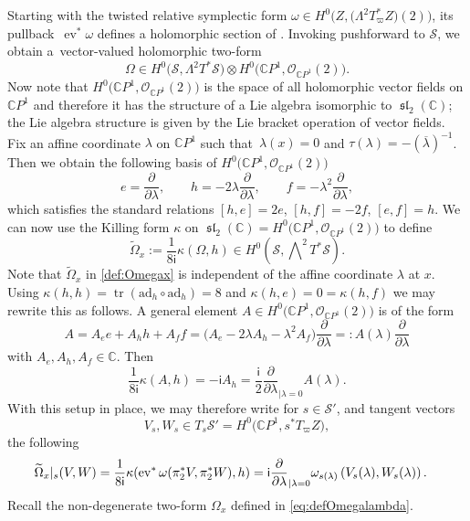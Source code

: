 \documentclass[pdftex]{sigma}
\numberwithin{equation}{section}
\theoremstyle{definition}
\newcommand{\lie}[1]{\operatorname{\mathfrak{#1}}}
\newcommand{\sln}{\lie{sl}}
\newcommand\C{{\mathbb C}}
\renewcommand{\i}{\mathsf{i}}
\newcommand{\pder}[2]{
		\IfEqCase{#1}{
			{}{\frac{\partial}{\partial {#2}}}
			{t}{\frac{\partial}{\partial {#2}}}
			}}
\begin{document}
Starting with the twisted relative symplectic form $\omega \in H^0\bigl(Z, \bigl(\Lambda^2T^*_\varpi Z\bigr)(2)\bigr)$, its pullback~$\operatorname{ev}^*\omega$ defines a holomorphic section of .
Invoking pushforward to $\mathcal S$, we obtain a~vector-valued holomorphic two-form
\begin{equation}\label{eq:Omegavector}
\Omega \in H^0\bigl(\mathcal S, \Lambda^2 T^*\mathcal S\bigr)\otimes H^0\bigl(\C P^1, \mathcal{O}_{\C P^1}(2)\bigr).
\end{equation}
Now note that $H^0\bigl(\C P^1, \mathcal{O}_{\C P^1}(2)\bigr)$ is the space of all holomorphic vector fields on $\C P^1$ and therefore
it has the structure of a Lie algebra isomorphic to $\sln_2(\C)$; the Lie algebra structure is given by the Lie bracket
operation of vector fields.
Fix an affine coordinate $\lambda$ on $\C P^1$ such that~${\lambda(x) = 0}$ and $\tau(\lambda)
 = -(\overline{\lambda})^{-1}$. Then we obtain the following basis of $H^0\bigl(\C P^1, \mathcal{O}_{\C P^1}(2)\bigr)$
\[%
e = \frac{\partial}{\partial\lambda},\qquad h = -2\lambda\frac{\partial}{\partial\lambda}, \qquad f
 = -\lambda^2\frac{\partial}{\partial\lambda},
\]
which satisfies the standard relations
$%
[h, e] = 2e$, $ [h, f] = -2f$, $ [e, f] = h$.
We can now use the Killing form $\kappa$ on $\sln_2(\C) = H^0\bigl(\C P^1, \mathcal{O}_{\C P^1}(2)\bigr)$ to define
\begin{equation}\label{def:Omegax}
\widetilde{\Omega}_x := \frac{1}{8 \i}\kappa(\Omega, h) \in
H^0\left(\mathcal S, \bigwedge\nolimits^2 T^*\mathcal S\right).
\end{equation}
Note that $\widetilde{\Omega}_x$ in \eqref{def:Omegax} is independent of the affine coordinate $\lambda$ at $x$.
Using $\kappa(h, h) = \operatorname{tr}(\mathrm{ad}_h\circ\mathrm{ad}_h) = 8$ and $\kappa(h, e)
 = 0 = \kappa(h, f)$ we may rewrite this as follows. A general element $A
 \in H^0\bigl(\C P^1, \mathcal{O}_{\C P^1}(2)\bigr)$ is of the form
\[A = A_ee + A_hh + A_ff = \bigl(A_e -2\lambda A_h-\lambda^2A_f\bigr)\frac{\partial}{\partial\lambda}
=: A(\lambda)\frac{\partial}{\partial\lambda}\]
with $A_e, A_h, A_f \in \C$. Then
\[
\frac{1}{8 \i}\kappa(A, h) = -\i A_h = \frac{\i}{2}\frac{\partial}{\partial\lambda}_{|\lambda =0}A(\lambda).
\]
With this setup in place, we may therefore write for $s \in \mathcal S'$, and tangent vectors
\[V_s, W_s \in T_s\mathcal S' = H^0\bigl(\C P^1, s^*T_{\varpi}Z\bigr),\]
the following
\begin{align}\label{eq:OmegaGeneral}
\widetilde\Omega_x\vert_s(V, W) & = \frac{1}{8\i}\kappa(\operatorname{ev}^*\omega(\pi_2^*V, \pi_2^*W), h) = \i \pder{t}{\lambda}_{|\lambda = 0}\omega_{s(\lambda)} \left(V_s(\lambda), W_s(\lambda)\right).
\end{align}
Recall the non-degenerate two-form $\Omega_x$ defined in \eqref{eq:defOmegalambda}.
\end{document}
